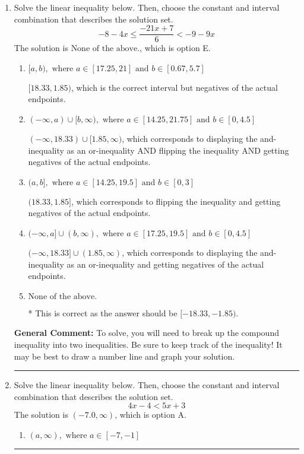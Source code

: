 \documentclass{extbook}[14pt]
\newcommand{\litem}[1]{\item #1

\rule{\textwidth}{0.4pt}}
\begin{document}
\begin{enumerate}
{\begin{enumerate}[label=\Alph*.]
This describes the values less than 9 from 1
\item \( \text{None of the above} \)

You likely thought the values in the interval were not correct.
\end{enumerate}

\textbf{General Comment:} When thinking about this language, it helps to draw a number line and try points.
}
\litem{
Solve the linear inequality below. Then, choose the constant and interval combination that describes the solution set.
\[ -8 - 4 x \leq \frac{-21 x + 7}{6} < -9 - 9 x \]The solution is \( \text{None of the above.} \), which is option E.\begin{enumerate}[label=\Alph*.]
\item \( [a, b), \text{ where } a \in [17.25, 21] \text{ and } b \in [0.67, 5.7] \)

$[18.33, 1.85)$, which is the correct interval but negatives of the actual endpoints.
\item \( (-\infty, a) \cup [b, \infty), \text{ where } a \in [14.25, 21.75] \text{ and } b \in [0, 4.5] \)

$(-\infty, 18.33) \cup [1.85, \infty)$, which corresponds to displaying the and-inequality as an or-inequality AND flipping the inequality AND getting negatives of the actual endpoints.
\item \( (a, b], \text{ where } a \in [14.25, 19.5] \text{ and } b \in [0, 3] \)

$(18.33, 1.85]$, which corresponds to flipping the inequality and getting negatives of the actual endpoints.
\item \( (-\infty, a] \cup (b, \infty), \text{ where } a \in [17.25, 19.5] \text{ and } b \in [0, 4.5] \)

$(-\infty, 18.33] \cup (1.85, \infty)$, which corresponds to displaying the and-inequality as an or-inequality and getting negatives of the actual endpoints.
\item \( \text{None of the above.} \)

* This is correct as the answer should be $[-18.33, -1.85)$.
\end{enumerate}

\textbf{General Comment:} To solve, you will need to break up the compound inequality into two inequalities. Be sure to keep track of the inequality! It may be best to draw a number line and graph your solution.
}
\litem{
Solve the linear inequality below. Then, choose the constant and interval combination that describes the solution set.
\[ 4x -4 < 5x + 3 \]The solution is \( (-7.0, \infty) \), which is option A.\begin{enumerate}[label=\Alph*.]
\item \( (a, \infty), \text{ where } a \in [-7, -1] \)


\end{enumerate}}
\end{enumerate}
\end{document}
